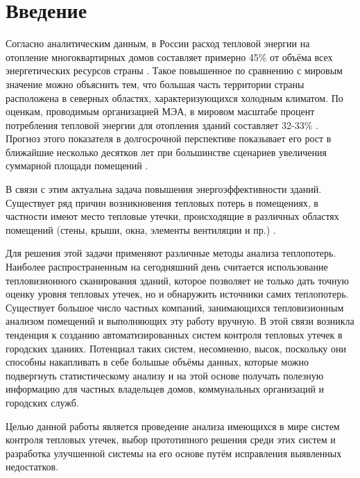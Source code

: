 {
	\titleformat{\section}[block]{\centering\normalfont\large\bfseries}{\thesection}{10pt}{}
	\section*{\centering Введение}
}

\par
	Согласно аналитическим данным, в России расход тепловой энергии на отопление многоквартирных домов составляет примерно 45\% от объёма всех энергетических ресурсов страны \cite{intro:thermo-analysis-federal}. Такое повышенное по сравнению с мировым значение можно объяснить тем, что большая часть территории страны расположена в северных областях, характеризующихся холодным климатом. По оценкам, проводимым организацией МЭА, в мировом масштабе процент потребления тепловой энергии для отопления зданий составляет 32-33\% \cite{intro:heating-drivers}. Прогноз этого показателя в долгосрочной перспективе показывает его рост в ближайшие несколько десятков лет при большинстве сценариев увеличения суммарной площади помещений \cite{intro:energy-use-perspective}.

\par
	В связи с этим актуальна задача повышения энергоэффективности зданий. Существует ряд причин возникновения тепловых потерь в помещениях, в частности имеют место тепловые утечки, происходящие в различных областях помещений (стены, крыши, окна, элементы вентиляции и пр.) \cite{intro:heat-loss-sources, intro:sources-residental}.

\par
	Для решения этой задачи применяют различные методы анализа теплопотерь. Наиболее распространенным на сегодняшний день считается использование тепловизионного сканирования зданий, которое позволяет не только дать точную оценку уровня тепловых утечек, но и обнаружить источники самих теплопотерь. Существует большое число частных компаний, занимающихся тепловизионным анализом помещений и выполняющих эту работу вручную. В этой связи возникла тенденция к созданию автоматизированных систем контроля тепловых утечек в городских зданиях. Потенциал таких систем, несомненно, высок, поскольку они способны накапливать в себе большые объёмы данных, которые можно подвергнуть статистическому анализу и на этой основе получать полезную информацию для частных владельцев домов, коммунальных организаций и городских служб.

\par
	Целью данной работы является проведение анализа имеющихся в мире систем контроля тепловых утечек, выбор прототипного решения среди этих систем и разработка улучшенной системы на его основе путём исправления выявленных недостатков.
